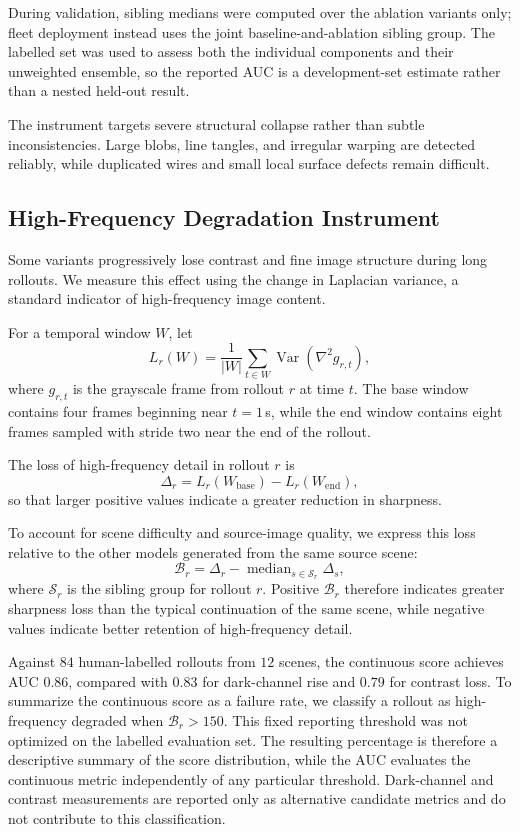 \documentclass[letterpaper]{article} %
\begin{document}
During validation, sibling medians were computed over the ablation variants
only; fleet deployment instead uses the joint baseline-and-ablation sibling
group. The labelled set was used to assess both the individual components and
their unweighted ensemble, so the reported AUC is a development-set estimate
rather than a nested held-out result.

The instrument targets severe structural collapse rather than subtle
inconsistencies. Large blobs, line tangles, and irregular warping are detected
reliably, while duplicated wires and small local surface defects remain
difficult.

\subsection{High-Frequency Degradation Instrument}
\label{app:high_frequency_metric}

Some variants progressively lose contrast and fine image structure during
long rollouts. We measure this effect using the change in Laplacian variance,
a standard indicator of high-frequency image content.

For a temporal window \(W\), let
\[
L_r(W)
=
\frac{1}{|W|}
\sum_{t\in W}
\operatorname{Var}\!\left(\nabla^2 g_{r,t}\right),
\]
where \(g_{r,t}\) is the grayscale frame from rollout \(r\) at time \(t\).
The base window contains four frames beginning near \(t=1\)\,s, while the
end window contains eight frames sampled with stride two near the end of the
rollout.

The loss of high-frequency detail in rollout \(r\) is
\[
\Delta_r
=
L_r(W_{\mathrm{base}})
-
L_r(W_{\mathrm{end}}),
\]
so that larger positive values indicate a greater reduction in sharpness.

To account for scene difficulty and source-image quality, we express this
loss relative to the other models generated from the same source scene:
\[
\mathcal B_r
=
\Delta_r
-
\operatorname{median}_{s\in\mathcal S_r}\Delta_s,
\]
where \(\mathcal S_r\) is the sibling group for rollout \(r\). Positive
\(\mathcal B_r\) therefore indicates greater sharpness loss than the typical
continuation of the same scene, while negative values indicate better
retention of high-frequency detail.

Against \(84\) human-labelled rollouts from \(12\) scenes, the continuous
score achieves AUC \(0.86\), compared with \(0.83\) for dark-channel rise and
\(0.79\) for contrast loss. To summarize the continuous score as a failure rate, we classify a rollout as
high-frequency degraded when $\mathcal B_r>150$. This fixed reporting
threshold was not optimized on the labelled evaluation set. The resulting
percentage is therefore a descriptive summary of the score distribution,
while the AUC evaluates the continuous metric independently of any particular
threshold. Dark-channel and contrast measurements are reported only as
alternative candidate metrics and do not contribute to this classification.
\end{document}
